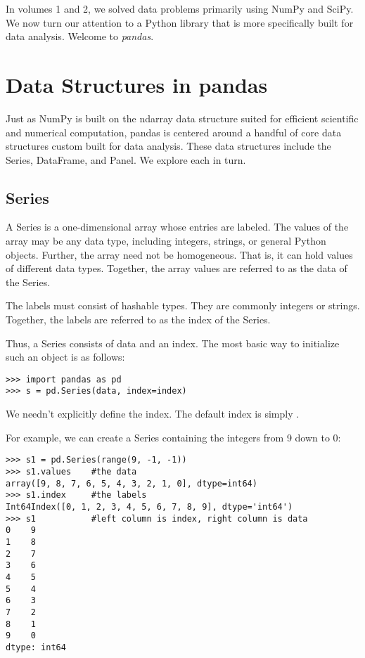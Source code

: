 
In volumes 1 and 2, we solved data problems primarily using NumPy and SciPy.
We now turn our attention to a Python library that is more specifically built for data
analysis. Welcome to \emph{pandas}.

\section*{Data Structures in pandas}
Just as NumPy is built on the ndarray data structure suited for efficient scientific and numerical
computation, pandas is centered around a handful of core data structures custom built for data
analysis. These data structures include the Series, DataFrame, and Panel. We explore each in turn.

\subsection*{Series}
A Series is a one-dimensional array whose entries are labeled. The values of the array may be
any data type, including integers, strings, or general Python objects. Further, the array
need not be homogeneous. That is, it can hold values of different data types. Together, the
array values are referred to as the data of the Series.

The labels must consist of hashable types. They are commonly integers or strings.
Together, the labels are referred to as the index of the Series.

Thus, a Series consists of data and an index. The most basic way to initialize such an object
is as follows:
\begin{lstlisting}
>>> import pandas as pd
>>> s = pd.Series(data, index=index)
\end{lstlisting}
We needn't explicitly define the index. The default index is simply .

For example, we can create a Series containing the integers from 9 down to 0:
\begin{lstlisting}
>>> s1 = pd.Series(range(9, -1, -1))
>>> s1.values    #the data
array([9, 8, 7, 6, 5, 4, 3, 2, 1, 0], dtype=int64)
>>> s1.index     #the labels
Int64Index([0, 1, 2, 3, 4, 5, 6, 7, 8, 9], dtype='int64')
>>> s1           #left column is index, right column is data
0    9
1    8
2    7
3    6
4    5
5    4
6    3
7    2
8    1
9    0
dtype: int64
\end{lstlisting}

